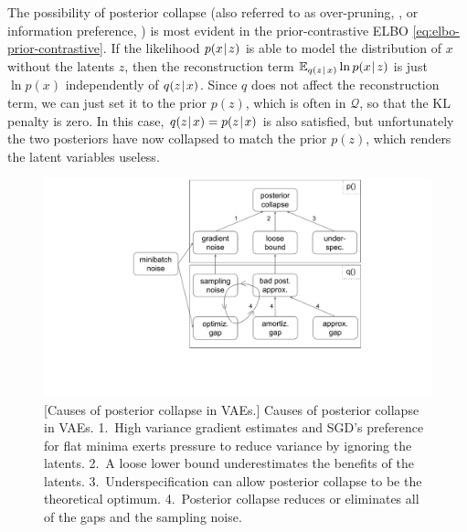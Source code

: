 The possibility of posterior collapse (also referred to as over-pruning, \citealt{yeung2017tackling}, or information preference, \citealt{zhao2019infovae}) is most evident in the prior-contrastive ELBO \eqref{eq:elbo-prior-contrastive}.
If the likelihood $p(x\hspace{0.08em}|\hspace{0.11em} z)$ is able to model the distribution of $x$ without the latents $z$, then the reconstruction term $\mathop{{}\mathbb{E}}_{q(z\hspace{0.08em}|\hspace{0.11em} x)} \ln p(x\hspace{0.08em}|\hspace{0.11em} z)$ is just $\ln p(x)$ independently of $q(z\hspace{0.08em}|\hspace{0.11em} x)$.
Since $q$ does not affect the reconstruction term, we can just set it to the prior $p(z)$, which is often in $\mathcal{Q}$, so that the KL penalty is zero.
In this case, $q(z\hspace{0.08em}|\hspace{0.11em} x) = p(z\hspace{0.08em}|\hspace{0.11em} x)$ is also satisfied, but unfortunately the two posteriors have now collapsed to match the prior $p(z)$, which renders the latent variables useless.

\begin{figure}
  \begin{minipage}{\linewidth}
    \hspace*{1.5cm} \includegraphics[scale=0.55,trim={4.5cm 3.2cm 2.5cm
        0.0cm},clip]{micmco/figure/posterior-collapse.pdf}
    [Causes of posterior collapse in VAEs.]{
      Causes of posterior collapse in VAEs. 1.~High variance gradient
      estimates and SGD's preference for flat minima exerts pressure
      to reduce variance by ignoring the latents. 2.~A loose lower
      bound underestimates the benefits of the latents.
      3.~Underspecification can allow posterior collapse to be the
      theoretical optimum. 4.~Posterior collapse reduces or eliminates
      all of the gaps and the sampling noise.}
    \label{fig:posterior-collapse}
  \end{minipage}
\end{figure}


